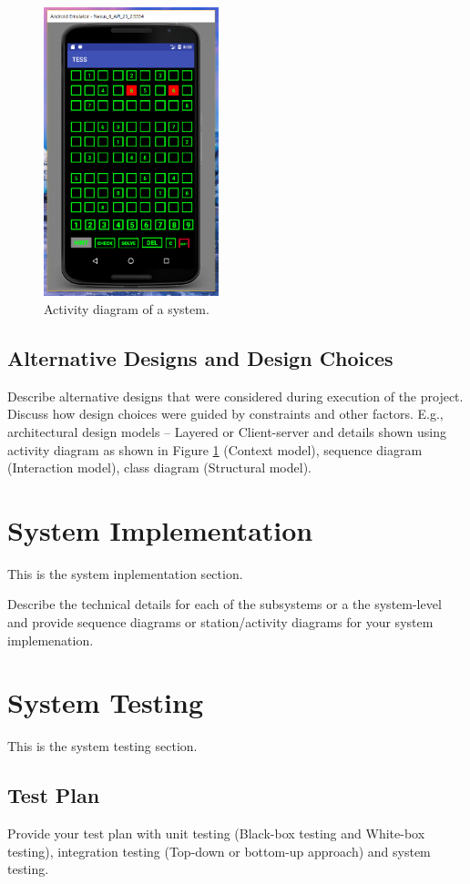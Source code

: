 \documentclass{article}
\begin{document}
\begin{figure}[!t]\centering
\includegraphics[width=2.0in]{./Figure/check.PNG}
\caption{Activity diagram of a system.}\label{fig:act_dia_1}
\end{figure}

\subsection{Alternative Designs and Design Choices}
Describe alternative designs that were considered during execution of the project. Discuss how design choices were guided by constraints and other factors. E.g., architectural design models – Layered or Client-server and details shown using activity diagram as shown in Figure \ref{fig:act_dia_1} (Context model), sequence diagram (Interaction model), class diagram (Structural model).



\section{System Implementation}
This is the system inplementation section.

Describe the technical details for each of the subsystems or a the system-level and
provide sequence diagrams or station/activity diagrams for your system implemenation.



\section{System Testing}
This is the system testing section.

\subsection{Test Plan}
Provide your test plan with unit testing (Black-box testing and White-box testing), integration testing (Top-down or bottom-up approach) and system testing.
\end{document}
